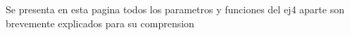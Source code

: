 Se presenta en esta pagina todos los parametros y funciones del ej4 aparte son brevemente explicados para su comprension 
